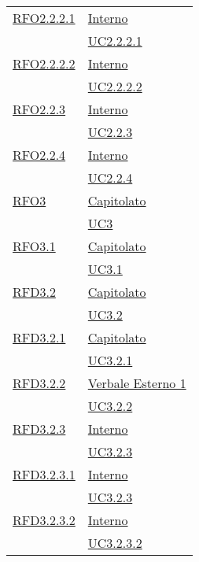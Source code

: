 \begin{longtable}{|>{\centering}m{5cm}|m{5cm}<{\centering}|}
\hyperlink{RFO2.2.2.1}{RFO2.2.2.1} & \hyperlink{Interno}{Interno}\\
& \hyperref[UC2.2.2.1]{UC2.2.2.1}\\ \hline

\hyperlink{RFO2.2.2.2}{RFO2.2.2.2} & \hyperlink{Interno}{Interno}\\
& \hyperref[UC2.2.2.2]{UC2.2.2.2}\\ \hline

\hyperlink{RFO2.2.3}{RFO2.2.3} & \hyperlink{Interno}{Interno}\\
& \hyperref[UC2.2.3]{UC2.2.3}\\ \hline

\hyperlink{RFO2.2.4}{RFO2.2.4} & \hyperlink{Interno}{Interno}\\
& \hyperref[UC2.2.4]{UC2.2.4}\\ \hline

\hyperlink{RFO3}{RFO3} & \hyperlink{Capitolato}{Capitolato}\\
& \hyperref[UC3]{UC3}\\ \hline

\hyperlink{RFO3.1}{RFO3.1} & \hyperlink{Capitolato}{Capitolato}\\
& \hyperref[UC3.1]{UC3.1}\\ \hline

\hyperlink{RFD3.2}{RFD3.2} & \hyperlink{Capitolato}{Capitolato}\\
& \hyperref[UC3.2]{UC3.2}\\ \hline

\hyperlink{RFD3.2.1}{RFD3.2.1} & \hyperlink{Capitolato}{Capitolato}\\
& \hyperref[UC3.2.1]{UC3.2.1}\\ \hline

\hyperlink{RFD3.2.2}{RFD3.2.2} & \hyperlink{Verbale Esterno 1}{Verbale Esterno 1}\\
& \hyperref[UC3.2.2]{UC3.2.2}\\ \hline

\hyperlink{RFD3.2.3}{RFD3.2.3} & \hyperlink{Interno}{Interno}\\
& \hyperref[UC3.2.3]{UC3.2.3}\\ \hline

\hyperlink{RFD3.2.3.1}{RFD3.2.3.1} & \hyperlink{Interno}{Interno}\\
& \hyperref[UC3.2.3]{UC3.2.3}\\ \hline

\hyperlink{RFD3.2.3.2}{RFD3.2.3.2} & \hyperlink{Interno}{Interno}\\
& \hyperref[UC3.2.3.2]{UC3.2.3.2}\\ \hline


\end{longtable}

